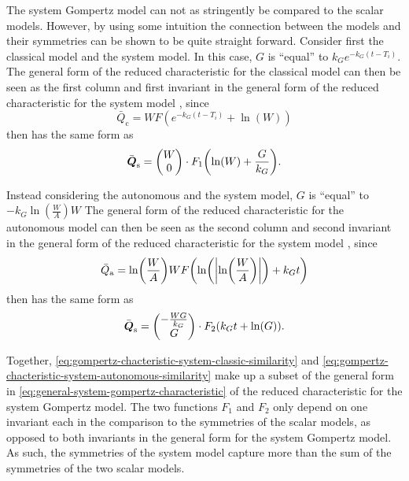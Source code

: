 The system Gompertz model can not as stringently be compared to the scalar models.
However, by using some intuition the connection between the models and their symmetries can be shown to be quite straight forward.
Consider first the classical model and the system model.
In this case, \(G\) is \enquote{equal} to \(k_G e^{-k_G (t - T_i)}\).
The general form of the reduced characteristic for the classical model  can then be seen as the first column and first invariant in the general form of the reduced characteristic for the system model , since
\begin{equation*}
  \bar{Q}_{\text{c}} = W F\left(e^{-k_G (t - T_i)} + \ln\left(W\right)\right)
\end{equation*}
then has the same form as
\begin{equation} \label{eq:gompertz-chacteristic-system-classic-similarity}
  \bar{\vect{Q}}_{\text{s}} =
  \begin{pmatrix}
    W \\
    0
  \end{pmatrix}
  \cdot F_1\left(\ln\left(W\right) + \frac{G}{k_G}\right).
\end{equation}

Instead considering the autonomous and the system model, \(G\) is \enquote{equal} to \(-k_G \ln\left(\frac{W}{A}\right) W\)
The general form of the reduced characteristic for the autonomous model  can then be seen as the second column and second invariant in the general form of the reduced characteristic for the system model , since
\begin{equation*}
  \bar{Q}_{\text{a}} = \ln\left(\frac{W}{A}\right) W F\left(\ln\left(\abs{\ln\left(\frac{W}{A}\right)}\right) + k_G t\right)
\end{equation*}
then has the same form as
\begin{equation} \label{eq:gompertz-chacteristic-system-autonomous-similarity}
  \bar{\vect{Q}}_{\text{s}} =
  \begin{pmatrix}
    - \frac{W G}{k_G} \\
    G
  \end{pmatrix}
  \cdot F_2\left(k_G t + \ln\left(G\right)\right).
\end{equation}

Together, \cref{eq:gompertz-chacteristic-system-classic-similarity} and \cref{eq:gompertz-chacteristic-system-autonomous-similarity} make up a subset of the general form in \cref{eq:general-system-gompertz-characteristic} of the reduced characteristic for the system Gompertz model.
The two functions \(F_1\) and \(F_2\) only depend on one invariant each in the comparison to the symmetries of the scalar models, as opposed to both invariants in the general form for the system Gompertz model.
As such, the symmetries of the system model capture more than the sum of the symmetries of the two scalar models.

